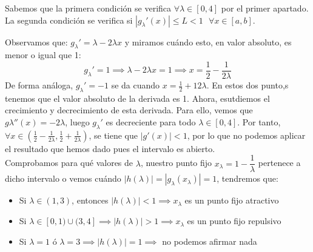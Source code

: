 \documentclass[11pt]{article}
\begin{document}
\begin{itemize}
Sabemos que la primera condición se verifica $\forall \lambda \in [0,4]$ por el primer apartado. La segunda condición se verifica si $|g_\lambda'(x)| \leq L < 1 \ \ \ \forall x \in [a,b]$.

Observamos que: $g_\lambda'= \lambda - 2\lambda x$ y miramos cuándo esto, en valor absoluto, es menor o igual que 1:
\[
g_\lambda ' = 1 \implies \lambda - 2\lambda x = 1 \implies x = \frac{1}{2} - \frac{1}{2\lambda}
\]
De forma análoga, $g_\lambda' = -1 $ se da cuando $x = \frac{1}{2} + {1}{2\lambda}$.
	En estos dos punto,s tenemos que el valor absoluto de la derivada es 1. Ahora, esutdiemos el crecimiento y decrecimiento de esta derivada. Para ello, vemos que $g\lambda''(x) = -2 \lambda$, luego $g_\lambda'$ es decreciente para todo $\lambda \in [0,4]$. Por tanto, $\forall x \in(\frac{1}{2}-\frac{1}{2\lambda},\frac{1}{2}+\frac{1}{2\lambda})$, se tiene que $|g'(x)| < 1$, por lo que no podemos aplicar el resultado que hemos dado pues el intervalo es abierto.\\

Comprobamos para qué valores de $\lambda$, nuestro punto fijo $x_\lambda = 1 - \dfrac{1}{\lambda}$ pertenece a dicho intervalo o vemos cuándo $|h(\lambda)| = |g_\lambda(x_\lambda)| = 1$, tendremos que:
	
	\begin{itemize}
	\item Si $\lambda \in (1,3)$, entonces $|h(\lambda)| < 1 \implies x_\lambda$ es un punto fijo atractivo
	\item Si $\lambda \in [0,1) \cup (3,4] \implies |h(\lambda)| > 1 \implies x_\lambda$ es un punto fijo repulsivo
	\item Si $\lambda = 1$ ó $\lambda = 3 \implies |h(\lambda)| = 1 \implies$ no podemos afirmar nada
	
	\end{itemize}

\end{itemize}
\end{document}
